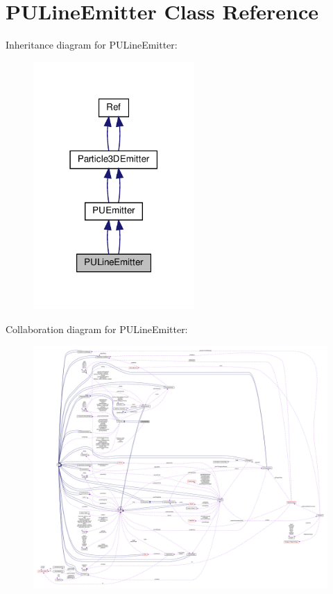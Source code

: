 \hypertarget{classPULineEmitter}{}\section{P\+U\+Line\+Emitter Class Reference}
\label{classPULineEmitter}


Inheritance diagram for P\+U\+Line\+Emitter\+:
\nopagebreak
\begin{figure}[H]
\begin{center}
\leavevmode
\includegraphics[width=174pt]{classPULineEmitter__inherit__graph}
\end{center}
\end{figure}


Collaboration diagram for P\+U\+Line\+Emitter\+:
\nopagebreak
\begin{figure}[H]
\begin{center}
\leavevmode
\includegraphics[width=350pt]{classPULineEmitter__coll__graph}
\end{center}
\end{figure}
